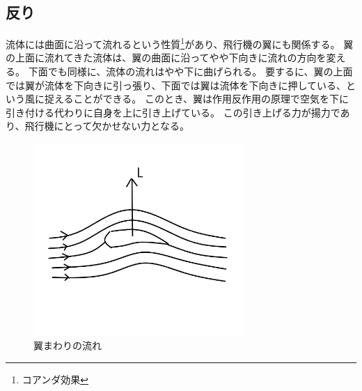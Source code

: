 \documentclass[10pt,b5paper,papersize,dvipdfmx]{jsbook}
\begin{document}
\subsection{反り}
流体には曲面に沿って流れるという性質\footnote{コアンダ効果}があり、飛行機の翼にも関係する。
翼の上面に流れてきた流体は、翼の曲面に沿ってやや下向きに流れの方向を変える。
下面でも同様に、流体の流れはやや下に曲げられる。
要するに、翼の上面では翼が流体を下向きに引っ張り、下面では翼は流体を下向きに押している、という風に捉えることができる。
このとき、翼は作用反作用の原理で空気を下に引き付ける代わりに自身を上に引き上げている。
この引き上げる力が揚力であり、飛行機にとって欠かせない力となる。
\begin{figure}[ht]
  \centering
  \includegraphics[width=80mm]{img/ryuutai7.png}
  \caption{翼まわりの流れ}
\end{figure}
\end{document}
